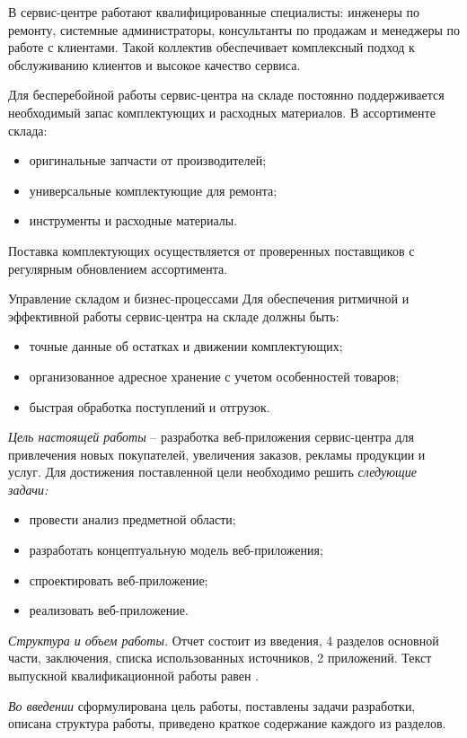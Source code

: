 В сервис-центре работают квалифицированные специалисты: инженеры по ремонту, системные администраторы, консультанты по продажам и менеджеры по работе с клиентами. Такой коллектив обеспечивает комплексный подход к обслуживанию клиентов и высокое качество сервиса.

Для бесперебойной работы сервис-центра на складе постоянно поддерживается необходимый запас комплектующих и расходных материалов. В ассортименте склада:
\begin{itemize}
\item оригинальные запчасти от производителей;
\item универсальные комплектующие для ремонта;
\item инструменты и расходные материалы.
\end{itemize}
Поставка комплектующих осуществляется от проверенных поставщиков с регулярным обновлением ассортимента. 

Управление складом и бизнес-процессами
Для обеспечения ритмичной и эффективной работы сервис-центра на складе должны быть:
\begin{itemize}
\item точные данные об остатках и движении комплектующих;
\item организованное адресное хранение с учетом особенностей товаров;
\item быстрая обработка поступлений и отгрузок.
\end{itemize}

\emph{Цель настоящей работы} – разработка веб-приложения сервис-центра для привлечения новых покупателей, увеличения заказов, рекламы продукции и услуг. Для достижения поставленной цели необходимо решить \emph{следующие задачи:}
\begin{itemize}
\item провести анализ предметной области;
\item разработать концептуальную модель веб-приложения;
\item спроектировать веб-приложение;
\item реализовать веб-приложение.
\end{itemize}

\emph{Структура и объем работы.} Отчет состоит из введения, 4 разделов основной части, заключения, списка использованных источников, 2 приложений. Текст выпускной квалификационной работы равен .

\emph{Во введении} сформулирована цель работы, поставлены задачи разработки, описана структура работы, приведено краткое содержание каждого из разделов.

